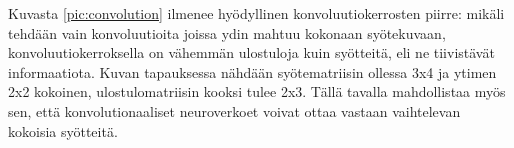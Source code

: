 \documentclass[finnish]{tktltiki2}
\theoremstyle{definition}
\theoremstyle{remark}
\begin{document}
    Kuvasta \ref{pic:convolution} ilmenee hyödyllinen konvoluutiokerrosten piirre: mikäli tehdään vain konvoluutioita joissa ydin mahtuu kokonaan syötekuvaan, konvoluutiokerroksella on vähemmän ulostuloja kuin syötteitä, eli ne tiivistävät informaatiota. Kuvan tapauksessa nähdään syötematriisin ollessa 3x4 ja ytimen 2x2 kokoinen, ulostulomatriisin kooksi tulee 2x3. Tällä tavalla mahdollistaa myös sen, että konvolutionaaliset neuroverkoet voivat ottaa vastaan vaihtelevan kokoisia syötteitä.


    



\end{document}
